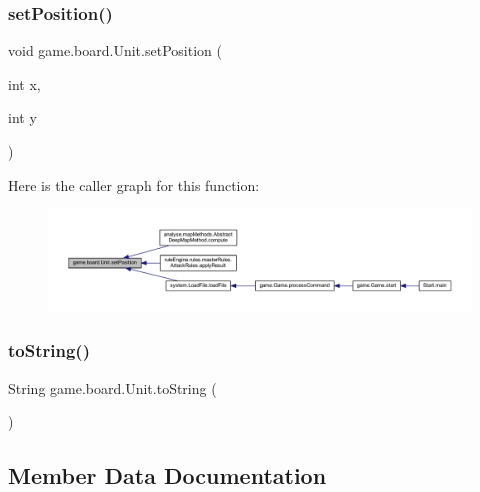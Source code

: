 \subsubsection{\texorpdfstring{set\+Position()}{setPosition()}}
{\footnotesize\ttfamily void game.\+board.\+Unit.\+set\+Position (\begin{DoxyParamCaption}\item[{int}]{x,  }\item[{int}]{y }\end{DoxyParamCaption})\hspace{0.3cm}{\ttfamily [inline]}}

Here is the caller graph for this function\+:
\nopagebreak
\begin{figure}[H]
\begin{center}
\leavevmode
\includegraphics[width=350pt]{classgame_1_1board_1_1_unit_a4bcf3d2f401d0245b74909e3b6716b9d_icgraph}
\end{center}
\end{figure}
\mbox{\label{classgame_1_1board_1_1_unit_a5f70549b97f3d51a32047258ee566e6d}} 
\subsubsection{\texorpdfstring{to\+String()}{toString()}}
{\footnotesize\ttfamily String game.\+board.\+Unit.\+to\+String (\begin{DoxyParamCaption}{ }\end{DoxyParamCaption})\hspace{0.3cm}{\ttfamily [inline]}}



\subsection{Member Data Documentation}
\mbox{\label{classgame_1_1board_1_1_unit_a56718dfd790432ee280596574f6f954e}} 
